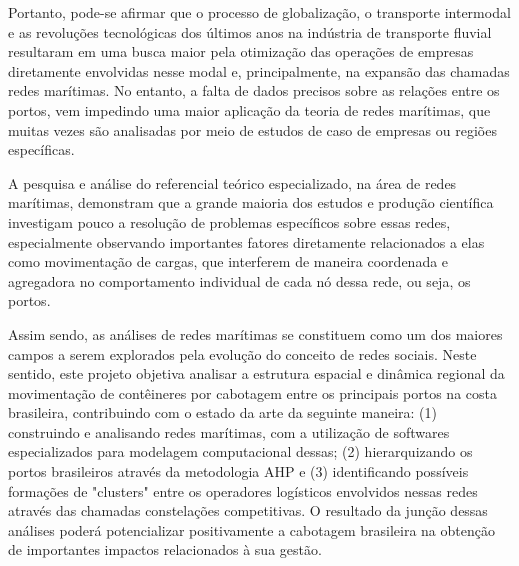 Portanto, pode-se afirmar que o processo de globalização, o transporte intermodal e as revoluções tecnológicas dos últimos anos na indústria de transporte fluvial resultaram em uma busca maior pela otimização das operações de empresas diretamente envolvidas nesse modal e, principalmente, na expansão das chamadas redes marítimas. No entanto, a falta de dados precisos sobre as relações entre os portos, vem impedindo uma maior aplicação da teoria de redes marítimas, que muitas vezes são analisadas por meio de estudos de caso de empresas ou regiões específicas.

A pesquisa e análise do referencial teórico especializado, na área de redes marítimas, demonstram que a grande maioria dos estudos e produção científica investigam pouco a resolução de problemas específicos sobre essas redes, especialmente observando importantes fatores diretamente relacionados a elas como movimentação de cargas, que interferem de maneira coordenada e agregadora no comportamento individual de cada nó dessa rede, ou seja, os portos.

Assim sendo, as análises de redes marítimas se constituem como um dos maiores campos a serem explorados pela evolução do conceito de redes sociais. Neste sentido, este projeto objetiva analisar a estrutura espacial e dinâmica regional da movimentação de contêineres por cabotagem entre os principais portos na costa brasileira, contribuindo com o estado da arte da seguinte maneira: (1) construindo e analisando redes marítimas, com a utilização de softwares especializados para modelagem computacional dessas; (2) hierarquizando os portos brasileiros através da metodologia AHP e (3) identificando possíveis formações de "clusters" entre os operadores logísticos envolvidos nessas redes através das chamadas constelações competitivas. O resultado da junção dessas análises poderá potencializar positivamente a cabotagem brasileira na obtenção de importantes impactos relacionados à sua gestão.
